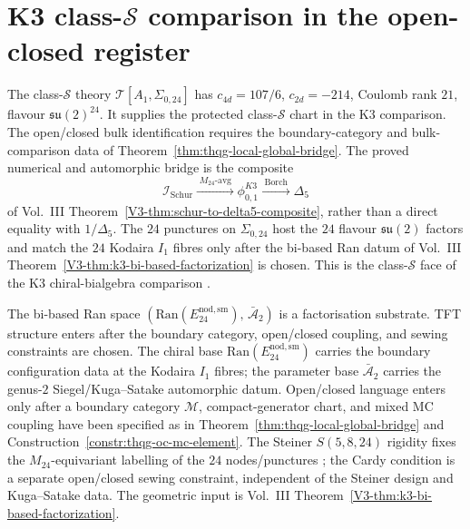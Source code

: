 \section{K3 class-\texorpdfstring{$\mathcal S$}{S} comparison in the open-closed register}
\label{sec:thqg-occ-supplement}

\begin{remark}
\label{rem:thqg-occ-1}
The class-$\mathcal S$ theory $\mathcal T[A_1,\Sigma_{0,24}]$ has
$c_{4d} = 107/6$, $c_{2d} = -214$, Coulomb rank $21$, flavour
$\mathfrak{su}(2)^{24}$. It supplies the protected class-$\mathcal S$
chart in the K3 comparison. The open/closed bulk identification
requires the boundary-category and bulk-comparison data of
Theorem~\ref{thm:thqg-local-global-bridge}. The proved numerical and
automorphic bridge is the composite
\[
 \mathcal I_{\mathrm{Schur}}
 \xrightarrow{\;M_{24}\text{-avg}\;}
 \phi_{0,1}^{K3}
 \xrightarrow{\;\mathrm{Borch}\;}
 \Delta_5
\]
of Vol.~III Theorem~\ref{V3-thm:schur-to-delta5-composite}, rather
than a direct equality with $1/\Delta_5$. The $24$ punctures on
$\Sigma_{0,24}$ host the $24$ flavour $\mathfrak{su}(2)$ factors and
match the $24$ Kodaira $I_1$ fibres only after the bi-based Ran datum
of Vol.~III Theorem~\ref{V3-thm:k3-bi-based-factorization} is chosen.
This is the class-$\mathcal S$ face of the K3 chiral-bialgebra
comparison \cite{Gaiotto2009,BeemRastelli2015}.
\end{remark}

\begin{remark}
\label{rem:thqg-occ-2}
The bi-based Ran space $(\mathrm{Ran}(E^{\mathrm{nod,sm}}_{24}),\,\bar{\mathcal A}_2)$
is a factorisation substrate. TFT structure enters after the boundary
category, open/closed coupling, and sewing constraints are chosen.
The chiral base
$\mathrm{Ran}(E^{\mathrm{nod,sm}}_{24})$ carries the boundary
configuration data at the Kodaira $I_1$ fibres; the parameter base
$\bar{\mathcal A}_2$ carries the genus-$2$ Siegel/Kuga--Satake
automorphic datum. Open/closed language enters only after a boundary
category $\mathcal M$, compact-generator chart, and mixed MC coupling
have been specified as in
Theorem~\ref{thm:thqg-local-global-bridge} and
Construction~\ref{constr:thqg-oc-mc-element}. The Steiner
$S(5,8,24)$ rigidity fixes the $M_{24}$-equivariant labelling of the
$24$ nodes/punctures \cite{ConwaySloane1988}; the Cardy condition is a
separate open/closed sewing constraint, independent of the Steiner
design and Kuga--Satake data. The geometric input is
Vol.~III Theorem~\ref{V3-thm:k3-bi-based-factorization}.
\end{remark}

